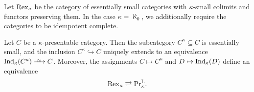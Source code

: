 \documentclass[11pt]{book}
\begin{document}
	\begin{definition}
		Let $\operatorname{Rex}_{\kappa}$ be the category of essentially small categories with $\kappa$-small colimits and functors preserving them. In the case $\kappa = \aleph_0$, we additionally require the categories to be idempotent complete.
	\end{definition}

	\begin{proposition}
		Let $C$ be a $\kappa$-presentable category. Then the subcategory $C^{\kappa} \subseteq C$ is essentially small, and the inclusion $C^{\kappa} \hookrightarrow C$ uniquely extends to an equivalence $\Ind_{\kappa}(C^{\kappa}) \iso C$. Moreover, the assignments $C \mapsto C^{\kappa}$ and $D \mapsto \operatorname{Ind}_{\kappa}(D)$ define an equivalence
		\[
			\operatorname{Rex}_{\kappa} \rightleftarrows \textup{Pr}^{\textup{L}}_{\kappa}.
		\]
	\end{proposition}

\end{document}
